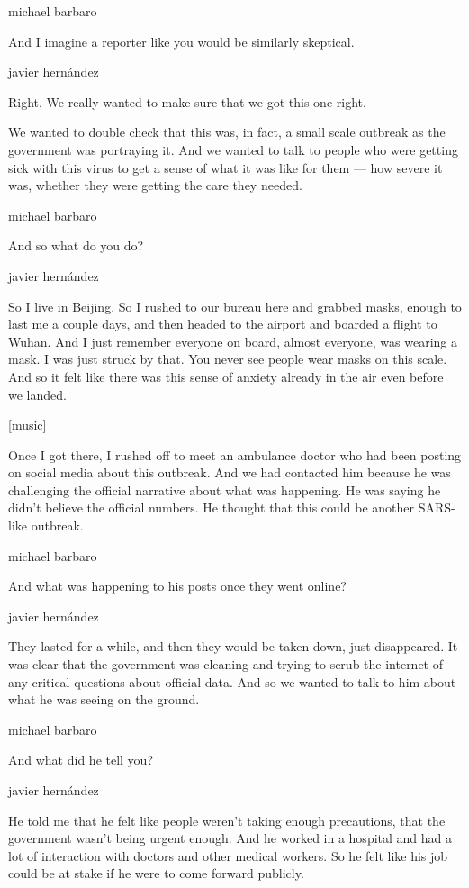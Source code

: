michael barbaro

And I imagine a reporter like you would be similarly skeptical.

javier hernández

Right. We really wanted to make sure that we got this one right.

We wanted to double check that this was, in fact, a small scale outbreak
as the government was portraying it. And we wanted to talk to people who
were getting sick with this virus to get a sense of what it was like for
them --- how severe it was, whether they were getting the care they
needed.

michael barbaro

And so what do you do?

javier hernández

So I live in Beijing. So I rushed to our bureau here and grabbed masks,
enough to last me a couple days, and then headed to the airport and
boarded a flight to Wuhan. And I just remember everyone on board, almost
everyone, was wearing a mask. I was just struck by that. You never see
people wear masks on this scale. And so it felt like there was this
sense of anxiety already in the air even before we landed.

{[}music{]}

Once I got there, I rushed off to meet an ambulance doctor who had been
posting on social media about this outbreak. And we had contacted him
because he was challenging the official narrative about what was
happening. He was saying he didn't believe the official numbers. He
thought that this could be another SARS-like outbreak.

michael barbaro

And what was happening to his posts once they went online?

javier hernández

They lasted for a while, and then they would be taken down, just
disappeared. It was clear that the government was cleaning and trying to
scrub the internet of any critical questions about official data. And so
we wanted to talk to him about what he was seeing on the ground.

michael barbaro

And what did he tell you?

javier hernández

He told me that he felt like people weren't taking enough precautions,
that the government wasn't being urgent enough. And he worked in a
hospital and had a lot of interaction with doctors and other medical
workers. So he felt like his job could be at stake if he were to come
forward publicly.

